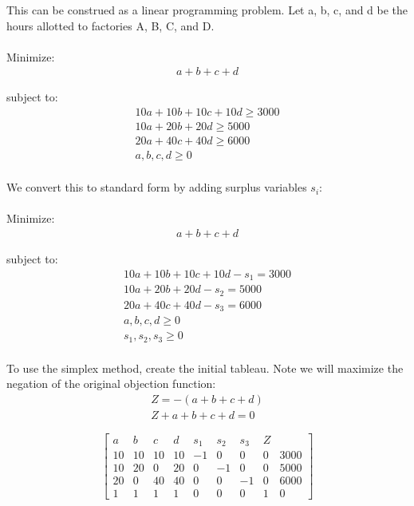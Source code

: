\documentclass{article}
\begin{document}
This can be construed as a linear programming problem.  Let a, b, c, and d be the hours allotted to factories A, B, C, and D.
\\
\\
Minimize:
\begin{equation*}
\begin{aligned}
a + b + c + d
\end{aligned}
\end{equation*}

subject to:
\begin{equation*}
\begin{aligned}
10a + 10b + 10c + 10d \geq 3000\\
10a + 20b + 20d \geq 5000\\
20a + 40c + 40d \geq 6000\\
a, b, c, d \geq 0\\
\end{aligned}
\end{equation*}

We convert this to standard form by adding surplus variables $s_i$:
\\
\\
Minimize:
\begin{equation*}
\begin{aligned}
a + b + c + d
\end{aligned}
\end{equation*}

subject to:
\begin{equation*}
\begin{aligned}
10a + 10b + 10c + 10d - s_1 = 3000\\
10a + 20b + 20d - s_2 = 5000\\
20a + 40c + 40d - s_3 = 6000\\
a, b, c, d \geq 0\\
s_1, s_2, s_3 \geq 0\\
\end{aligned}
\end{equation*}

To use the simplex method, create the initial tableau.
Note we will maximize the negation of the original objection function:
\begin{equation*}
\begin{aligned}
Z = -(a + b + c + d)\\
Z + a + b + c + d = 0
\end{aligned}
\end{equation*}

\[
	\begin{bmatrix}
	a & b & c & d & s_1 & s_2 & s_3 & Z\\
	10 & 10 & 10 & 10 & -1 &  0 & 0  & 0 & 3000\\
	10 & 20 & 0  & 20 &  0 & -1 & 0  & 0 & 5000\\
	20 &  0 & 40 & 40 &  0 &  0 & -1 & 0 & 6000\\
	1  &  1 &  1 &  1 &  0 &  0 & 0  & 1 & 0
	\end{bmatrix}
\]
\end{document}
